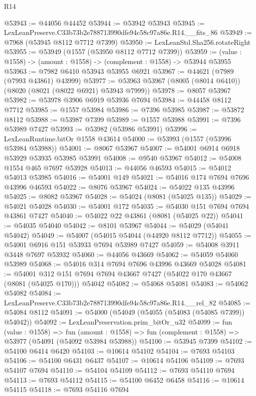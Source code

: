 \begin{lexlean}{R14}
\begin{coremodule}
@53943 := @44056 @44452
@53944 := @53942 @53943
@53945 := LexLeanPreserve.C33b73b2e788713990dfe94c58c97a86e.R14.__fits_86
@53949 := @7968 (@53945 @8112 @7712 @7399)
@53950 := LexLeanStd.Sha256.rotateRight
@53955 := @53949 (@1557 (@53950 @8112 @7712 @7399))
@53959 := (value : @1558) -> (amount : @1558) -> (complement : @1558) -> @53944 @53955
@53963 := @7982 @6410 @53943 @53955 @6921
@53967 := @44621 (@7989 (@7993 @43861) @43999)
@53977 := @53963 @53967 (@8005 (@8014 @6410)) (@8020 (@8021 (@8022 @6921) @53943 @7999))
@53978 := @8057 @53967
@53982 := @53978 @3906 @6919 @53936 @7694
@53984 := @44458 @8112 @7712
@53985 := @1557 @53984
@53986 := @7396 @53985
@53987 := @53872 @8112
@53988 := @53987 @7399
@53989 := @1557 @53988
@53991 := @7396 @53989 @7427
@53993 := @53982 (@53986 @53991)
@53996 := LexLeanRuntime.bitOr @1558 @43614
@54000 := @53993 (@1557 (@53996 @53984 @53988))
@54001 := @8067 @53967
@54007 := @54001 @6914 @6918 @53929 @53935 @53985 @53991
@54008 := @9540 @53967
@54012 := @54008 @1554 @465 @7697 @53928
@54013 := @44056 @46593
@54015 := @54012 @54013 @53985
@54016 := @54001 @149
@54021 := @54016 @174 @7694 @7696 @43996 @46593
@54022 := @8076 @53967
@54024 := @54022 @135 @43996
@54025 := @8082 @53967
@54028 := @54024 (@8081 (@54025 @135))
@54029 := @54021 @54028
@54030 := @54001 @172
@54035 := @54030 @151 @7694 @7694 @43861 @7427
@54040 := @54022 @22 @43861 (@8081 (@54025 @22))
@54041 := @54035 @54040
@54042 := @8101 @53967
@54044 := @54029 (@54041 @54042)
@54049 := @54007 (@54015 @54044 (@44920 @8112 @7712))
@54055 := @54001 @6916 @151 @53933 @7694 @53989 @7427
@54059 := @54008 @3911 @3448 @7697 @53932
@54060 := @44056 @43669
@54062 := @54059 @54060 @53989
@54068 := @54016 @314 @7694 @7696 @43996 @43669 @54028
@54081 := @54001
    @312
    @151
    @7694
    @7694
    @43667
    @7427
    (@54022 @170 @43667 (@8081 (@54025 @170)))
    @54042
@54082 := @54068 @54081
@54083 := @54062 @54082
@54084 := LexLeanPreserve.C33b73b2e788713990dfe94c58c97a86e.R14.__rel_82
@54085 := @54084 @8112
@54091 := @54000 (@54049 (@54055 (@54083 (@54085 @7399)) @54042))
@54092 := LexLeanPreservation.prim_bitOr_u32
@54099 := fun (value : @1558) =>
  fun (amount : @1558) => fun (complement : @1558) => @53977 (@54091 (@54092 @53984 @53988))
@54100 := @53945 @7399
@54102 := @54100 @6414 @6420
@54103 := @10614 @54102
@54104 := @7693 @54103
@54106 := @54100 @6431 @6437
@54107 := @10614 @54106
@54109 := @7693 @54107 @7694
@54110 := @54104 @54109
@54112 := @7693 @54110 @7694
@54113 := @7693 @54112
@54115 := @54100 @6452 @6458
@54116 := @10614 @54115
@54118 := @7693 @54116 @7694

\end{coremodule}
\end{lexlean}
